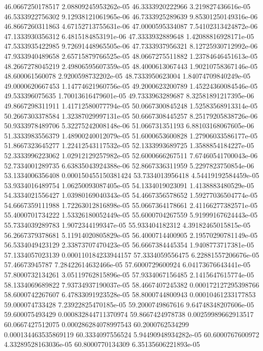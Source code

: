 {46.0667250178517 2.08809245953262e-05
46.3333920222966 3.219827436616e-05
46.5333922756302 9.12938121061965e-06
46.7333925289639 9.85301250149316e-06
46.8667260311863 4.67152713755631e-06
47.0000595334087 7.54102313424872e-06
47.1333930356312 6.4815184853191e-06
47.3333932889648 1.42088816928171e-05
47.5333935422985 9.72691448965505e-06
47.7333937956321 8.12725930712992e-06
47.9333940489658 2.65715879766525e-05
48.0667275511882 1.23784646451613e-05
48.2667278045219 2.49806595607359e-05
48.4000613067443 1.90210758367146e-05
48.600061560078 2.9200598732202e-05
48.7333950623004 1.84074709840249e-05
49.0000620667453 1.14774621960756e-05
49.2000623200789 1.45224360084546e-05
49.533396075635 1.70013616479601e-05
49.7333963289687 8.32581891217395e-06
49.8667298311911 1.41712580077794e-05
50.0667300845248 1.52583568913314e-05
50.2667303378584 1.32387029997131e-05
50.6667308445257 8.25179205838726e-06
50.9333978489706 5.32275242008148e-06
51.066731351193 6.88103168067605e-06
51.3333983556379 1.48900240012079e-05
51.6000653600828 1.27906033586177e-05
51.8667323645277 1.22412543117532e-05
52.1333993689725 1.3588854184227e-05
52.3333996223062 1.02912129257982e-05
52.6000666267511 7.67460541700043e-06
52.7334001289735 6.63835043924388e-06
52.8667336311959 5.2297823750854e-06
53.1334006356408 0.000150455150381424
53.7334013956418 4.54419192584459e-05
53.9334016489754 1.06250093087405e-05
54.1334019023091 1.4138883480529e-05
54.3334021556427 1.03980169040343e-05
54.4667356578652 1.59277036504774e-05
54.6667359111988 1.72263012816898e-05
55.0667364178661 2.41166277382571e-05
55.4000701734222 1.53326180052449e-05
55.6000704267559 5.91999167624443e-05
55.7334039289783 1.9072344199347e-05
55.933404182312 4.39182465015815e-05
56.2667379378681 5.11914020805829e-05
56.4000714400905 2.19570290781149e-05
56.5334049423129 2.33873707470423e-05
56.6667384445354 1.9408773717381e-05
57.1334057023139 0.000110184233944157
57.3334059556475 6.22881557206676e-05
57.46673945787 7.28422614632466e-05
57.6000729600924 6.04173676643441e-05
57.8000732134261 3.05119762815896e-05
57.9334067156485 2.1415647615774e-05
58.1334069689822 7.93734937190037e-05
58.4667407245382 0.000172127295398766
58.6000742267607 6.47833091923528e-05
58.8000744800943 0.00010461233177853
59.000074733428 7.23922825470185e-05
59.2000749867616 9.64748348207606e-05
59.600075493429 0.000832844711370974
59.8667424978738 0.00259989662913517
60.0667427512075 0.000286284078997543
60.2000762534299 0.000134463535869119
60.3334097556524 5.94490948934282e-05
60.6000767600972 4.33289528163036e-05
60.8000770134309 6.35135606221893e-05
}
